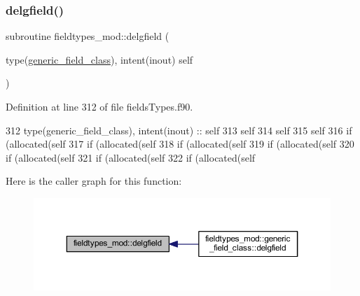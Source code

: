 \subsubsection{\texorpdfstring{delgfield()}{delgfield()}}
{\footnotesize\ttfamily subroutine fieldtypes\+\_\+mod\+::delgfield (\begin{DoxyParamCaption}\item[{type(\mbox{\hyperlink{structfieldtypes__mod_1_1generic__field__class}{generic\+\_\+field\+\_\+class}}), intent(inout)}]{self }\end{DoxyParamCaption})\hspace{0.3cm}{\ttfamily [private]}}



Definition at line 312 of file fields\+Types.\+f90.


\begin{DoxyCode}
312     \textcolor{keywordtype}{type}(generic\_field\_class), \textcolor{keywordtype}{intent(inout)} :: self
313     self%
314     self%
315     self%
316     \textcolor{keywordflow}{if} (\textcolor{keyword}{allocated}(self%
317     \textcolor{keywordflow}{if} (\textcolor{keyword}{allocated}(self%
318     \textcolor{keywordflow}{if} (\textcolor{keyword}{allocated}(self%
319     \textcolor{keywordflow}{if} (\textcolor{keyword}{allocated}(self%
320     \textcolor{keywordflow}{if} (\textcolor{keyword}{allocated}(self%
321     \textcolor{keywordflow}{if} (\textcolor{keyword}{allocated}(self%
322     \textcolor{keywordflow}{if} (\textcolor{keyword}{allocated}(self%
\end{DoxyCode}
Here is the caller graph for this function\+:\nopagebreak
\begin{figure}[H]
\begin{center}
\leavevmode
\includegraphics[width=350pt]{namespacefieldtypes__mod_a4ec7b627804dfcdf20e3374ecc1cf459_icgraph}
\end{center}
\end{figure}
\mbox{\label{namespacefieldtypes__mod_a1012f73b2800753dd774d0dbff861b6f}} 
